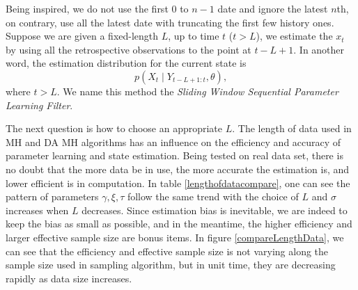 Being inspired, we do not use the first $0$ to $n-1$ date and ignore the latest $n$th, on contrary, use all the latest date with truncating the first few history ones. Suppose we are given a fixed-length $L$, up to time $t$ ($t>L$),  we estimate the $x_t$ by using all the retrospective observations to the point at $t-L+1$. In another word, the estimation distribution for the current state is 
\begin{equation}
p(X_{t}\mid Y_{t-L+1:t},\theta),
\end{equation}
where $t>L$. We name this method the \textit{Sliding Window Sequential Parameter Learning Filter}. 

The next question is how to choose an appropriate $L$. The length of data used in MH and DA MH algorithms has an influence on the efficiency and accuracy of parameter learning and state estimation. Being tested on real data set, there is no doubt that the more data be in use, the more accurate the estimation is, and lower efficient is in computation. In table \ref{lengthofdatacompare}, one can see the pattern of parameters $\gamma,\xi,\tau$ follow the same trend with the choice of $L$ and $\sigma$ increases when $L$ decreases. Since estimation bias is inevitable, we are indeed to keep the bias as small as possible, and in the meantime, the higher efficiency and larger effective sample size are bonus items. In figure \ref{compareLengthData}, we can see that the efficiency and effective sample size is not varying along the sample size used in sampling algorithm, but in unit time, they are decreasing rapidly as data size increases. 
